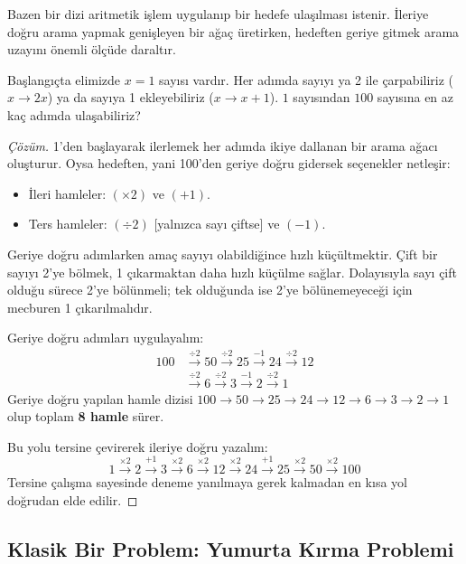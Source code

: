 Bazen bir dizi aritmetik işlem uygulanıp bir hedefe ulaşılması istenir. İleriye doğru arama yapmak genişleyen bir ağaç üretirken, hedeften geriye gitmek arama uzayını önemli ölçüde daraltır.

\begin{example}
Başlangıçta elimizde $x = 1$ sayısı vardır. Her adımda sayıyı ya 2 ile çarpabiliriz ($x \to 2x$) ya da sayıya 1 ekleyebiliriz ($x \to x + 1$). $1$ sayısından $100$ sayısına en az kaç adımda ulaşabiliriz?
\end{example}

\begin{proof}[Çözüm]
1'den başlayarak ilerlemek her adımda ikiye dallanan bir arama ağacı oluşturur. Oysa hedeften, yani 100'den geriye doğru gidersek seçenekler netleşir:
\begin{itemize}
    \item İleri hamleler: $(\times 2)$ ve $(+1)$.
    \item Ters hamleler: $(\div 2)$ [yalnızca sayı çiftse] ve $(-1)$.
\end{itemize}
Geriye doğru adımlarken amaç sayıyı olabildiğince hızlı küçültmektir. Çift bir sayıyı 2'ye bölmek, 1 çıkarmaktan daha hızlı küçülme sağlar. Dolayısıyla sayı çift olduğu sürece 2'ye bölünmeli; tek olduğunda ise 2'ye bölünemeyeceği için mecburen 1 çıkarılmalıdır.

Geriye doğru adımları uygulayalım:
\begin{align*}
100 &\xrightarrow{\div 2} 50 \xrightarrow{\div 2} 25 \xrightarrow{-1} 24 \xrightarrow{\div 2} 12 \\
&\xrightarrow{\div 2} 6 \xrightarrow{\div 2} 3 \xrightarrow{-1} 2 \xrightarrow{\div 2} 1
\end{align*}
Geriye doğru yapılan hamle dizisi $100 \to 50 \to 25 \to 24 \to 12 \to 6 \to 3 \to 2 \to 1$ olup toplam \textbf{8 hamle} sürer.

Bu yolu tersine çevirerek ileriye doğru yazalım:
\[
1 \xrightarrow{\times 2} 2 \xrightarrow{+1} 3 \xrightarrow{\times 2} 6 \xrightarrow{\times 2} 12 \xrightarrow{\times 2} 24 \xrightarrow{+1} 25 \xrightarrow{\times 2} 50 \xrightarrow{\times 2} 100
\]
Tersine çalışma sayesinde deneme yanılmaya gerek kalmadan en kısa yol doğrudan elde edilir.
\end{proof}

\subsection{Klasik Bir Problem: Yumurta Kırma Problemi}

